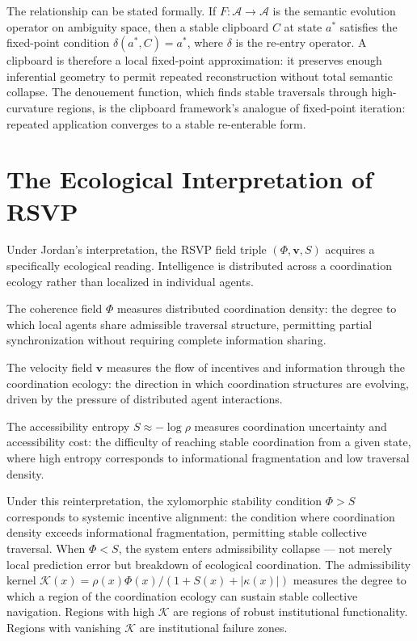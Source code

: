 \documentclass[12pt,oneside]{book}
\theoremstyle{plain}
\theoremstyle{definition}
\theoremstyle{plain}
\newcommand{\cA}{\mathcal{A}}
\begin{document}
The relationship can be stated formally. If $F : \cA \to \cA$ is the semantic evolution operator on ambiguity space, then a stable clipboard $C$ at state $a^*$ satisfies the fixed-point condition $\delta(a^*, C) = a^*$, where $\delta$ is the re-entry operator. A clipboard is therefore a local fixed-point approximation: it preserves enough inferential geometry to permit repeated reconstruction without total semantic collapse. The denouement function, which finds stable traversals through high-curvature regions, is the clipboard framework's analogue of fixed-point iteration: repeated application converges to a stable re-enterable form.

\section{The Ecological Interpretation of RSVP}

Under Jordan's interpretation, the RSVP field triple $(\Phi, \mathbf{v}, S)$ acquires a specifically ecological reading. Intelligence is distributed across a coordination ecology rather than localized in individual agents.

The coherence field $\Phi$ measures distributed coordination density: the degree to which local agents share admissible traversal structure, permitting partial synchronization without requiring complete information sharing.

The velocity field $\mathbf{v}$ measures the flow of incentives and information through the coordination ecology: the direction in which coordination structures are evolving, driven by the pressure of distributed agent interactions.

The accessibility entropy $S \approx -\log \rho$ measures coordination uncertainty and accessibility cost: the difficulty of reaching stable coordination from a given state, where high entropy corresponds to informational fragmentation and low traversal density.

Under this reinterpretation, the xylomorphic stability condition $\Phi > S$ corresponds to systemic incentive alignment: the condition where coordination density exceeds informational fragmentation, permitting stable collective traversal. When $\Phi < S$, the system enters admissibility collapse — not merely local prediction error but breakdown of ecological coordination. The admissibility kernel $\mathcal{K}(x) = \rho(x)\Phi(x)/(1 + S(x) + |\kappa(x)|)$ measures the degree to which a region of the coordination ecology can sustain stable collective navigation. Regions with high $\mathcal{K}$ are regions of robust institutional functionality. Regions with vanishing $\mathcal{K}$ are institutional failure zones.
\end{document}
